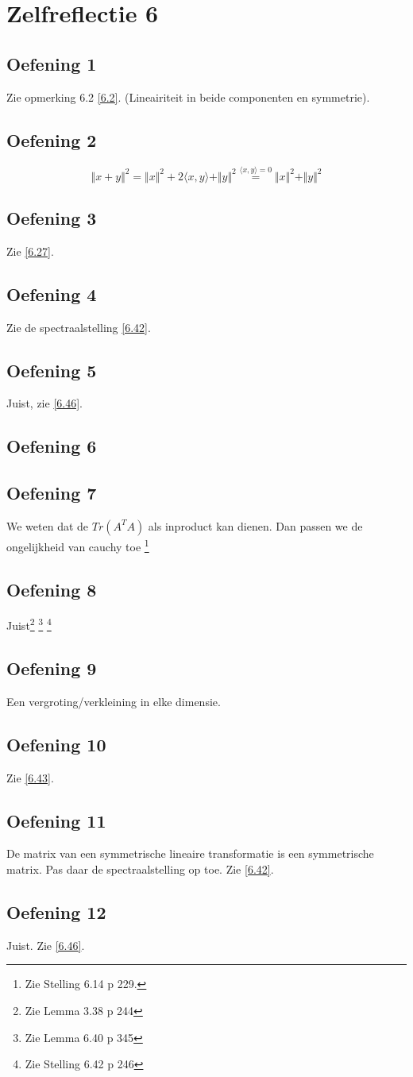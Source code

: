 \documentclass[lineaire_algebra_oplossingen.tex]{subfiles}
\begin{document}
\section{Zelfreflectie 6}
\subsection{Oefening 1}
Zie opmerking 6.2 \ref{6.2}. (Lineairiteit in beide componenten en symmetrie).

\subsection{Oefening 2}
\[
\Vert x+y \Vert^2 = \Vert x\Vert^2 + 2\langle x,y \rangle+ \Vert y\Vert^2 \overset{\langle x,y \rangle = 0}{=}\Vert x\Vert^2 + \Vert y\Vert^2
\]

\subsection{Oefening 3}
Zie \ref{6.27}.

\subsection{Oefening 4}
Zie de spectraalstelling \ref{6.42}.

\subsection{Oefening 5}
Juist, zie \ref{6.46}.

\subsection{Oefening 6}

\subsection{Oefening 7}
We weten dat de $Tr(A^T A)$ als inproduct kan dienen. Dan passen we de ongelijkheid van cauchy toe \footnote{Zie Stelling 6.14 p 229.}

\subsection{Oefening 8}
Juist\footnote{Zie Lemma 3.38 p 244} \footnote{Zie Lemma 6.40 p 345} \footnote{Zie Stelling 6.42 p 246}

\subsection{Oefening 9}
Een vergroting/verkleining in elke dimensie.

\subsection{Oefening 10}
Zie \ref{6.43}.

\subsection{Oefening 11}
De matrix van een symmetrische lineaire transformatie is een symmetrische matrix. Pas daar de spectraalstelling op toe. Zie \ref{6.42}.

\subsection{Oefening 12}
Juist. Zie \ref{6.46}.
\end{document}
